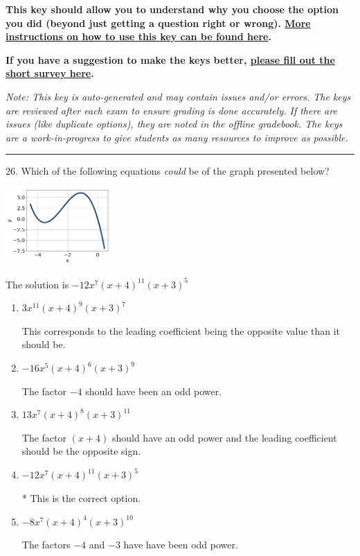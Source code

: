 \documentclass{article}[14pt]
\begin{document}
\textbf{This key should allow you to understand why you choose the option you did (beyond just getting a question right or wrong). \href{https://xronos.clas.ufl.edu/mac1105spring2020/courseDescriptionAndMisc/Exams/LearningFromResults}{More instructions on how to use this key can be found here}.}

\textbf{If you have a suggestion to make the keys better, \href{https://forms.gle/CZkbZmPbC9XALEE88}{please fill out the short survey here}.}

\textit{Note: This key is auto-generated and may contain issues and/or errors. The keys are reviewed after each exam to ensure grading is done accurately. If there are issues (like duplicate options), they are noted in the offline gradebook. The keys are a work-in-progress to give students as many resources to improve as possible.}

\rule{\textwidth}{0.4pt}

26. Which of the following equations \textit{could} be of the graph presented below?
\begin{center} \includegraphics[width=0.3\textwidth]{../Figures/polyGraphToFunctionA.png} \end{center} 

The solution is $ -12x^{7} (x + 4)^{11} (x + 3)^{5} $ 

\begin{enumerate}[label=\Alph*.] 
\item $ 3x^{11} (x + 4)^{9} (x + 3)^{7} $ 

 This corresponds to the leading coefficient being the opposite value than it should be. 
\item $ -16x^{5} (x + 4)^{6} (x + 3)^{9} $ 

 The factor $-4$ should have been an odd power. 
\item $ 13x^{7} (x + 4)^{8} (x + 3)^{11} $ 

 The factor $(x + 4)$ should have an odd power and the leading coefficient should be the opposite sign. 
\item $ -12x^{7} (x + 4)^{11} (x + 3)^{5} $ 

 * This is the correct option. 
\item $ -8x^{7} (x + 4)^{4} (x + 3)^{10} $ 

 The factors $-4$ and $-3$ have have been odd power. 
\end{enumerate} 
 
\end{document}
